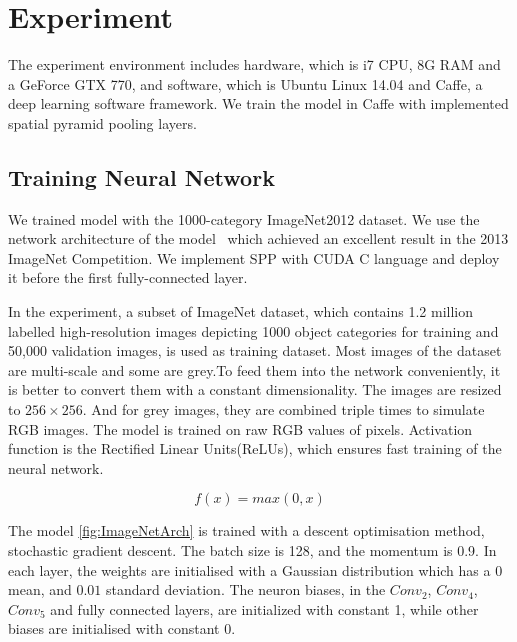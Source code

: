 
\chapter{Experiment} %
\label{Chapter4}

The experiment environment includes hardware, which is i7 CPU, 8G RAM and a GeForce GTX 770, and software, which is Ubuntu Linux 14.04 and Caffe\citep{jia2014caffe}, a deep learning software framework. We train the model in Caffe with implemented spatial pyramid pooling layers.

\section{Training Neural Network}

We trained model with the 1000-category ImageNet2012 dataset. We use the network architecture of the model~\cite{ZeilerF13} which achieved an excellent result in the 2013 ImageNet Competition. We implement SPP with CUDA C language and deploy it before the first fully-connected layer.

In the experiment, a subset of ImageNet dataset, which contains 1.2 million labelled high-resolution images depicting 1000 object categories for training and 50,000 validation images, is used as training dataset. Most images of the dataset are multi-scale and some are grey.To feed them into the network conveniently, it is better to convert them with a constant dimensionality. The images are resized to $256\times256$. And for grey images, they are combined triple times to simulate RGB images. The model is trained on raw RGB values of pixels. Activation function is the Rectified Linear Units(ReLUs), which ensures fast training of the neural network.

\begin{equation}\label{eq:ReLU}
f(x) = max(0, x)
\end{equation}

The model \ref{fig:ImageNetArch} is trained with a descent optimisation method, stochastic gradient descent. The batch size is 128, and the momentum is 0.9.  In each layer, the weights are initialised with a Gaussian distribution which has  a $0$ mean, and $0.01$ standard deviation. The neuron biases, in the $Conv_{2}$, $Conv_{4}$, $Conv_{5}$ and fully connected layers, are initialized with constant 1, while other biases are initialised with constant 0.

